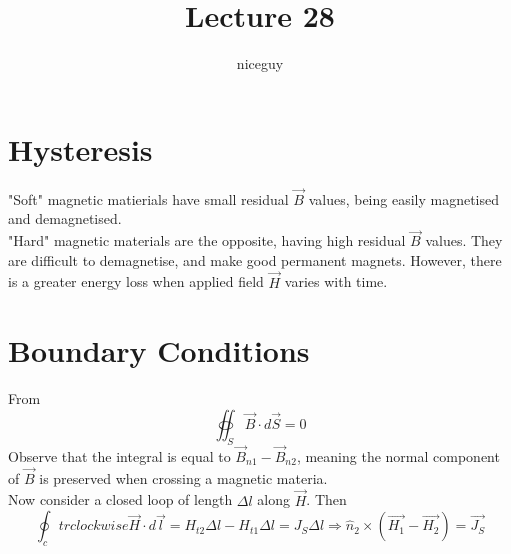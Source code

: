 \documentclass[12pt]{article}
\author{niceguy}
\title{Lecture 28}
\begin{document}
\maketitle

\section{Hysteresis}

"Soft" magnetic matierials have small residual $\vec B$ values, being easily magnetised and demagnetised. \\
"Hard" magnetic materials are the opposite, having high residual $\vec B$ values. They are difficult to demagnetise, and make good permanent magnets. However, there is a greater energy loss when applied field $\vec H$ varies with time.

\section{Boundary Conditions}

From
$$\oiint_S \vec B \cdot d\vec S = 0$$
Observe that the integral is equal to $\vec B_{n1} - \vec B_{n2}$, meaning the normal component of $\vec B$ is preserved when crossing a magnetic materia. \\
Now consider a closed loop of length $\Delta l$ along $\vec H$. Then
$$\oint_ctrclockwise \vec H \cdot d\vec l = H_{t2} \Delta l - H_{t1} \Delta l = J_S\Delta l \Rightarrow \hat n_2 \times (\vec{H_1} - \vec{H_2}) = \vec{J_S}$$
\end{document}
